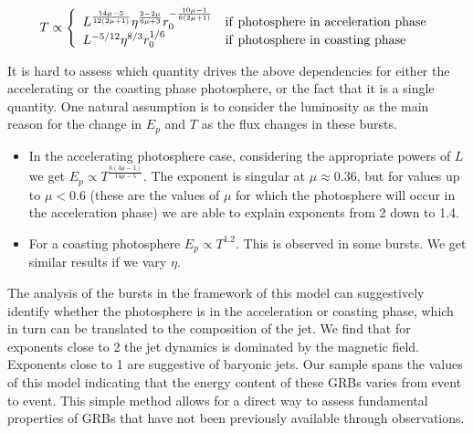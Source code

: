 \begin{equation}
T \propto \left\{
\begin{array}{ll}
  L^{\frac{14\mu-5}{12(2\mu+1)}} \eta^{\frac{2-2\mu}{6\mu+3}}
  r_0^{-\frac{10\mu-1}{6(2\mu+1)}} 	&	{\rm if~photosphere~ in~acceleration~ phase}\\ 
  L^{-5/12} \eta^{8/3} r_0^{1/6}  	&	{\rm if~photosphere~ in~ coasting~ phase} 
\end{array}
\right.
\label{eq:temp}
\end{equation}


It is hard to assess which quantity drives the above dependencies for
either the accelerating or the coasting phase photosphere, or the fact
that it is a single quantity.  One natural assumption is to consider
the luminosity as the main reason for the change in $E_p$ and $T$ as
the flux changes in these bursts.

\begin{itemize}
\item In the accelerating photosphere case, considering the
  appropriate powers of $L$ we get $E_p \propto
  T^{\frac{6(3\mu-1)}{14\mu-5}}$. The exponent is singular at
  $\mu\approx0.36$, but for values up to $\mu < 0.6$ (these are
  the values of $\mu$ for which the photosphere will occur in the
  acceleration phase) we are able to explain exponents from 2 down to
  1.4.

\item For a coasting photosphere $E_p \propto T^{1.2}$. This is
  observed in some bursts. We get similar results if we vary $\eta$.

\end{itemize}

The analysis of the bursts in the framework of this model can
suggestively identify whether the photosphere is in the acceleration
or coasting phase, which in turn can be translated to the composition
of the jet.  We find that for exponents close to 2 the jet dynamics is
dominated by the magnetic field.  Exponents close to 1 are suggestive
of baryonic jets. Our sample spans the values of this model indicating
that the energy content of these GRBs varies from event to event. This
simple method allows for a direct way to assess fundamental properties
of GRBs that have not been previously available through observations.





